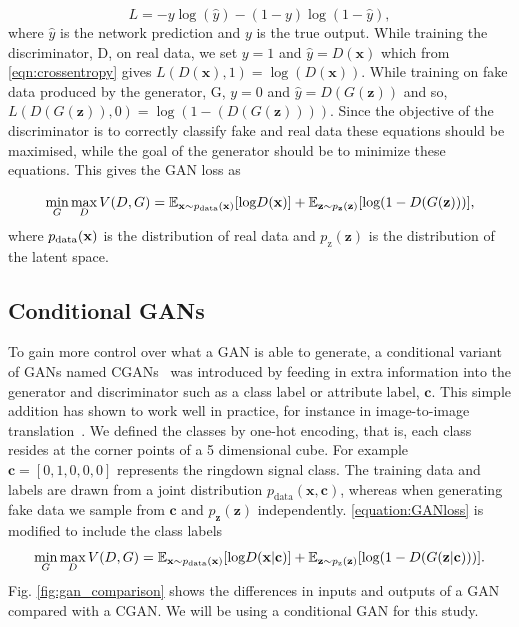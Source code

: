 \documentclass[12pt]{iopart}
\begin{document}
\begin{equation}
    L = -y \log(\hat{y}) - (1 - y) \log(1-\hat{y}),
    \label{eqn:crossentropy}
\end{equation}
where $\hat{y}$ is the network prediction and $y$ is the true output. While training the discriminator, D, on real data, we set $y = 1$ and $\hat{y} = D(\mathbf{x})$ which from \cref{eqn:crossentropy} gives $L(D(\mathbf{x}),1) = \log(D(\mathbf{x}))$. While training on fake data produced by the generator, G, $y = 0$ and $\hat{y} = D(G(\mathbf{z}))$ and so, $L(D(G(\mathbf{z})),0) = \log(1-(D(G(\mathbf{z}))))$. Since the objective of the discriminator is to correctly classify fake and real data these equations should be maximised, while the goal of the generator should be to minimize these equations. This gives the \ac{GAN} loss as

\begin{equation}
   \mathop{\text{min}}_{G}  \mathop{\text{max}}_{D} V(D,G) = \mathbb{E}_{\mathbf{x} \sim p_{\text{\text{data}}}(\mathbf{x})} [\text{log} D(\mathbf{x})] + \mathbb{E}_{\mathbf{z} \sim p_{\mathbf{z}}(\mathbf{z})} [\text{log}(1-D(G(\mathbf{z})))],
 \label{equation:GANloss}
 \end{equation}
where $p_{\text{\text{data}}}(\mathbf{x})$ is the distribution of real data and $p_{\text{z}}(\mathbf{z})$ is the distribution of the latent space. 

\subsection{Conditional GANs}

%
To gain more control over what a GAN is able to generate, a conditional variant
of \acp{GAN} named \acp{CGAN}~\cite{cgan} was introduced by feeding in extra
information into the generator and discriminator such as a class label or
attribute label, $\mathbf{c}$. This simple addition has shown to work well in practice, for instance in image-to-image translation~\cite{isola2016imagetoimage}. We defined the classes by one-hot encoding, that is, each class resides at the corner points of a 5 dimensional cube. For example $\mathbf{c}=[0,1,0,0,0]$ represents the ringdown signal class. The training data and labels are drawn from a joint distribution $p_{\text{data}}(\mathbf{x},\mathbf{c})$, whereas when generating fake data we sample from $\mathbf{c}$ and $p_{\mathbf{z}}(\mathbf{z})$ independently. \cref{equation:GANloss} is modified to include the class labels 
~
\begin{equation}
   \mathop{\text{min}}_{G}  \mathop{\text{max}}_{D} V(D,G) = \mathbb{E}_{\mathbf{x} \sim p_{\text{\text{data}}}(\mathbf{x})} [\text{log} D(\mathbf{x|c})] + \mathbb{E}_{\mathbf{z} \sim p_{\text{z}}(\mathbf{z})} [\text{log}(1-D(G(\mathbf{z|c})))].
 \label{equation:CGANloss}
 \end{equation}
Fig. \ref{fig:gan_comparison} shows the differences in inputs and outputs of a GAN compared with a \ac{CGAN}. We will be using a conditional GAN for this study.
\end{document}
